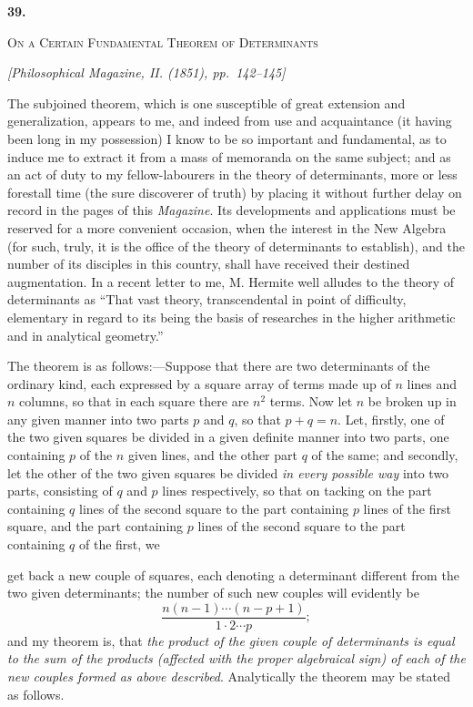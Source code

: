 \documentclass[11pt]{article}
\newcommand{\paperhead}[3]{%
  \clearpage
  \begin{center}
  {\Large\bfseries #1.}\par\vspace{0.85em}
  {\large\scshape #2}\par\vspace{0.6em}
  {\itshape [#3]}\par
  \end{center}\vspace{0.4em}}
\newcommand{\sourcepage}[1]{\marginpar{\scriptsize p.~#1}}
\begin{document}
{{\paperhead{39}{On a Certain Fundamental Theorem of Determinants}{Philosophical Magazine, II. (1851), pp.~142--145}

\sourcepage{252}
The subjoined theorem, which is one susceptible of great extension and generalization, appears to me, and indeed from use and acquaintance (it having been long in my possession) I know to be so important and fundamental, as to induce me to extract it from a mass of memoranda on the same subject; and as an act of duty to my fellow-labourers in the theory of determinants, more or less forestall time (the sure discoverer of truth) by placing it without further delay on record in the pages of this \emph{Magazine}. Its developments and applications must be reserved for a more convenient occasion, when the interest in the New Algebra (for such, truly, it is the office of the theory of determinants to establish), and the number of its disciples in this country, shall have received their destined augmentation. In a recent letter to me, M. Hermite well alludes to the theory of determinants as ``That vast theory, transcendental in point of difficulty, elementary in regard to its being the basis of researches in the higher arithmetic and in analytical geometry.''

The theorem is as follows:---Suppose that there are two determinants of the ordinary kind, each expressed by a square array of terms made up of $n$ lines and $n$ columns, so that in each square there are $n^2$ terms. Now let $n$ be broken up in any given manner into two parts $p$ and $q$, so that $p+q=n$. Let, firstly, one of the two given squares be divided in a given definite manner into two parts, one containing $p$ of the $n$ given lines, and the other part $q$ of the same; and secondly, let the other of the two given squares be divided \emph{in every possible way} into two parts, consisting of $q$ and $p$ lines respectively, so that on tacking on the part containing $q$ lines of the second square to the part containing $p$ lines of the first square, and the part containing $p$ lines of the second square to the part containing $q$ of the first, we

\sourcepage{253}
get back a new couple of squares, each denoting a determinant different from the two given determinants; the number of such new couples will evidently be
\[
\frac{n(n-1)\cdots(n-p+1)}{1\cdot2\cdots p};
\]
and my theorem is, that \emph{the product of the given couple of determinants is equal to the sum of the products (affected with the proper algebraical sign) of each of the new couples formed as above described}. Analytically the theorem may be stated as follows.

}}
\end{document}

